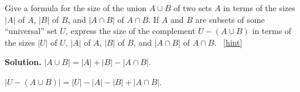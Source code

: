 \documentclass{book}
\begin{document}
\setcounter{project}{217}
\addtocounter{project}{-1}
\begin{activity}[]\label{twosetintersection}
\hypertarget{p-1235}{}%
Give a formula for the size of the union \(A\cup B\) of two sets \(A\) in terms of the sizes \(|A|\) of \(A\), \(|B|\) of \(B\), and \(|A\cap B|\) of \(A\cap B\). If \(A\) and \(B\) are subsets of some ``universal'' set \(U\), express the size of the complement \(U-(A\cup B)\) in terms of the sizes \(|U|\) of \(U\), \(|A|\) of \(A\), \(|B|\) of \(B\), and \(|A\cap B|\) of \(A\cap B\).%
~\hfill{\tiny\hyperlink{a-217}{[hint]}\hypertarget{q-217}{}}\par\smallskip%
\noindent\textbf{Solution.}\hypertarget{solution-149}{}\quad%
\hypertarget{p-1237}{}%
\(|A\cup B|=|A| + |B| - |A\cap B|\).%
\par
\hypertarget{p-1238}{}%
\(|U-(A\cup B)| = |U|-|A|-|B| + |A
\cap B|\).%
\end{activity}
\end{document}
